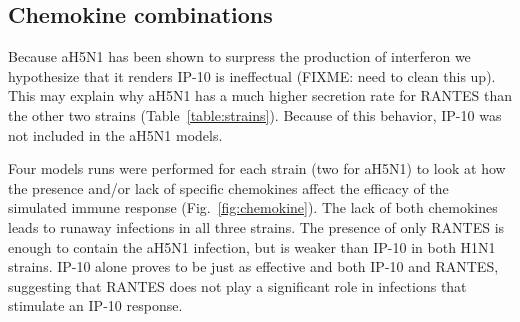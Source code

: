 \documentclass[10pt]{article}
\begin{document}
\subsection*{Chemokine combinations}

Because aH5N1 has been shown to surpress the production of interferon \cite{Mitchell2011} we hypothesize that it renders IP-10 is ineffectual (FIXME: need to clean this up).  This may explain why aH5N1 has a much higher secretion rate for RANTES than the other two strains (Table~\ref{table:strains}).  Because of this behavior, IP-10 was not included in the aH5N1 models.

Four models runs were performed for each strain (two for aH5N1) to look at how the presence and/or lack of specific chemokines affect the efficacy of the simulated immune response (Fig.~\ref{fig:chemokine}).  The lack of both chemokines leads to runaway infections in all three strains.  The presence of only RANTES is enough to contain the aH5N1 infection, but is weaker than IP-10 in both H1N1 strains.  IP-10 alone proves to be just as effective and both IP-10 and RANTES, suggesting that RANTES does not play a significant role in infections that stimulate an IP-10 response.
\end{document}
